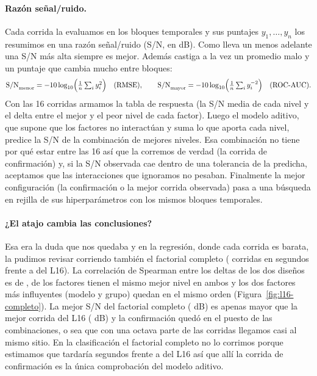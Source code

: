 \paragraph{Razón señal/ruido.} Cada corrida la evaluamos en los
\DatBloquesCV{} bloques temporales y sus puntajes $y_1,\dots,y_n$ los
resumimos en una razón señal/ruido (S/N, en dB). Como lleva un menos
adelante una S/N más alta siempre es mejor. Además castiga a la vez un
promedio malo y un puntaje que cambia mucho entre bloques:
\[
\text{S/N}_\text{menor} = -10\log_{10}\Bigl(\tfrac{1}{n}\textstyle\sum_i y_i^2\Bigr)
\quad\text{(RMSE)},\qquad
\text{S/N}_\text{mayor} = -10\log_{10}\Bigl(\tfrac{1}{n}\textstyle\sum_i y_i^{-2}\Bigr)
\quad\text{(ROC-AUC)}.
\]
Con las 16 corridas armamos la tabla de respuesta (la S/N media de cada
nivel y el delta entre el mejor y el peor nivel de cada factor). Luego el
modelo aditivo, que supone que
los factores no interactúan y suma lo que aporta cada nivel, predice la S/N
de la combinación de mejores niveles. Esa combinación no tiene por qué estar
entre las 16 así que la corremos de verdad (la corrida de confirmación) y, si la
S/N observada cae dentro de una tolerancia de la predicha, aceptamos que las
interacciones que ignoramos no pesaban. Finalmente la mejor configuración
(la confirmación o la mejor corrida observada) pasa a una búsqueda en rejilla
de sus hiperparámetros con los mismos bloques temporales.

\paragraph{¿El atajo cambia las conclusiones?} Esa era la duda que nos quedaba
y en la regresión, donde cada corrida es barata, la pudimos revisar corriendo
también el factorial completo (\RegCorridasCompleto{} corridas en
\RegSegundosCompleto{} segundos frente a \RegSegundosLSixteen{} del L16). La
correlación de Spearman entre los deltas de los dos diseños es de
\RegRhoCompleto{}, \RegFactoresMismoOptimo{} de los \RegFactores{} factores
tienen el mismo mejor nivel en ambos y los dos factores más influyentes
(modelo y grupo) quedan en el mismo orden (Figura~\ref{fig:l16-completo}). La
mejor S/N del factorial completo (\RegSNMejorCompleto{} dB) es apenas mayor
que la mejor corrida del L16 (\RegSNMejorCorrida{} dB) y la confirmación
quedó en el puesto \RegPuestoConfirmacion{} de las \RegCorridasCompleto{}
combinaciones, o sea que con una octava parte de las corridas llegamos casi
al mismo sitio. En la clasificación el factorial completo no lo corrimos
porque estimamos que tardaría \ClfSegundosCompletoEstimados{} segundos frente
a \ClfSegundosLSixteen{} del L16 así que allí la corrida de confirmación es
la única comprobación del modelo aditivo.

